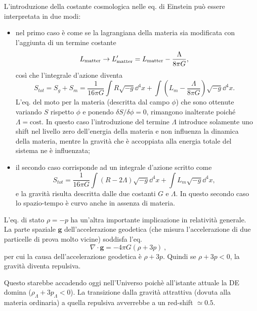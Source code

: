 L'introduzione della costante cosmologica nelle eq. di Einstein
può essere interpretata in due modi:
\begin{itemize}
\item nel primo caso è come se la lagrangiana della materia sia modificata con
  l'aggiunta di un termine costante
  \begin{equation}
    L_{\textup{matter}} \to L'_{\textup{matter}} = L_{\textup{matter}} -
    \frac{\Lambda}{8 \pi G},
  \end{equation}
  così che l'integrale d'azione diventa
  \begin{equation}
    S_{tot}=S_{g}+S_{m}= \frac {1}{16 \pi G} \int R \sqrt{-g} \dd^4x + \int
    \left( L_{m}- \frac {\Lambda}{8 \pi G} \right) \sqrt{-g} \dd^4 x.
  \end{equation}
  L'eq. del moto per la materia (descritta dal campo $\phi$) che sono ottenute
  variando $S$ rispetto $\phi$ e ponendo $\delta S/\delta \phi=0$, rimangono
  inalterate poiché $\Lambda=\text{cost}$.  In questo caso l'introduzione del
  termine $\Lambda$ introduce solamente uno shift nel livello zero dell'energia
  della materia e non influenza la dinamica della materia, mentre la gravità che
  è accoppiata alla energia totale del sistema ne è influenzata;
\item il secondo caso corrisponde ad un integrale d'azione scritto come
  \begin{equation}
    S_{tot}= \frac {1}{16 \pi G}
    \int (R-2\Lambda)  \sqrt{-g} \dd^4x + \int  L_{m} \sqrt{-g} \dd^4 x,
  \end{equation}
  e la gravità risulta descritta dalle due costanti $G$ e $\Lambda$.  In questo
  secondo caso lo spazio-tempo è curvo anche in assenza di materia.
\end{itemize}

L'eq. di stato $\rho=-p$ ha un'altra importante implicazione in relatività
generale.  La parte spaziale $\bm{g}$ dell'accelerazione geodetica (che misura
l'accelerazione di due particelle di prova molto vicine) soddisfa l'eq.
\begin{equation}
  \nabla \cdot \bm{g} = - 4 \pi G (\rho+3p)~,
\end{equation}
per cui la causa dell'accelerazione geodetica è $\rho+3p$.  Quindi se
$\rho+3p<0$, la gravità diventa repulsiva.

Questo starebbe accadendo oggi nell'Universo poichè all'istante attuale la DE
domina ($\rho_{\Lambda}+3 p_{\Lambda} <0$).  La transizione dalla gravità
attrattiva (dovuta alla materia ordinaria) a quella repulsiva avverrebbe a un
red-shift $\simeq 0.5$.

